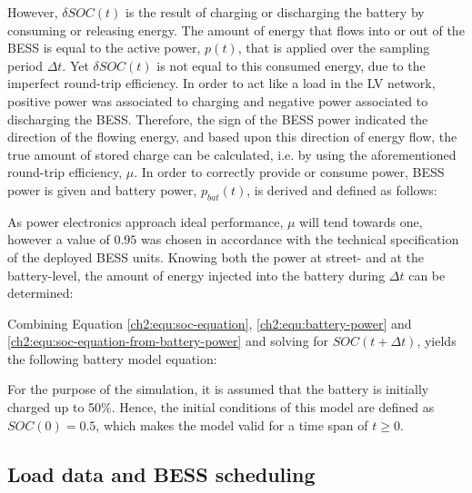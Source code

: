 

However, $\delta SOC(t)$ is the result of charging or discharging the battery by consuming or releasing energy.
The amount of energy that flows into or out of the BESS is equal to the active power, $p(t)$, that is applied over the sampling period $\Delta t$.
Yet $\delta SOC(t)$ is not equal to this consumed energy, due to the imperfect round-trip efficiency.
In order to act like a load in the LV network, positive power was associated to charging and negative power associated to discharging the BESS.
Therefore, the sign of the BESS power indicated the direction of the flowing energy, and based upon this direction of energy flow, the true amount of stored charge can be calculated, i.e. by using the aforementioned round-trip efficiency, $\mu$.
In order to correctly provide or consume power, BESS power is given and battery power, $p_{bat}(t)$, is derived and defined as follows:



As power electronics approach ideal performance, $\mu$ will tend towards one, however a value of $0.95$ was chosen in accordance with the technical specification of the deployed BESS units.
Knowing both the power at street- and at the battery-level, the amount of energy injected into the battery during $\Delta t$ can be determined:



Combining Equation \ref{ch2:equ:soc-equation}, \ref{ch2:equ:battery-power} and \ref{ch2:equ:soc-equation-from-battery-power} and solving for $SOC(t+\Delta t)$, yields the following battery model equation:



For the purpose of the simulation, it is assumed that the battery is initially charged up to 50\%.
Hence, the initial conditions of this model are defined as $SOC(0) = 0.5$, which makes the model valid for a time span of $t \geq 0$.

\subsection{Load data and BESS scheduling}


